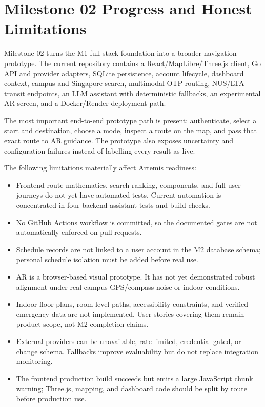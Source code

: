 \documentclass[11pt]{article}
\begin{document}
\newpage
\section*{Milestone 02 Progress and Honest Limitations}

Milestone 02 turns the M1 full-stack foundation into a broader navigation prototype. The current repository contains a React/MapLibre/Three.js client, Go API and provider adapters, SQLite persistence, account lifecycle, dashboard context, campus and Singapore search, multimodal OTP routing, NUS/LTA transit endpoints, an LLM assistant with deterministic fallbacks, an experimental AR screen, and a Docker/Render deployment path.

The most important end-to-end prototype path is present: authenticate, select a start and destination, choose a mode, inspect a route on the map, and pass that exact route to AR guidance. The prototype also exposes uncertainty and configuration failures instead of labelling every result as live.

The following limitations materially affect Artemis readiness:

\begin{itemize}[leftmargin=*]
    \item Frontend route mathematics, search ranking, components, and full user journeys do not yet have automated tests. Current automation is concentrated in four backend assistant tests and build checks.
    \item No GitHub Actions workflow is committed, so the documented gates are not automatically enforced on pull requests.
    \item Schedule records are not linked to a user account in the M2 database schema; personal schedule isolation must be added before real use.
    \item AR is a browser-based visual prototype. It has not yet demonstrated robust alignment under real campus GPS/compass noise or indoor conditions.
    \item Indoor floor plans, room-level paths, accessibility constraints, and verified emergency data are not implemented. User stories covering them remain product scope, not M2 completion claims.
    \item External providers can be unavailable, rate-limited, credential-gated, or change schema. Fallbacks improve evaluability but do not replace integration monitoring.
    \item The frontend production build succeeds but emits a large JavaScript chunk warning; Three.js, mapping, and dashboard code should be split by route before production use.
\end{itemize}
\end{document}
